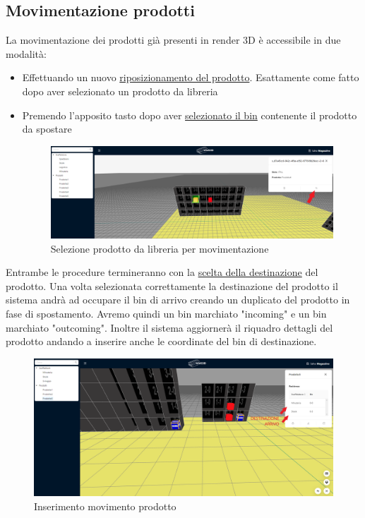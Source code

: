     \subsection{Movimentazione prodotti}\label{sec:movimento}
        La movimentazione dei prodotti già presenti in render 3D è accessibile in due modalità: 
        \begin{itemize}
            \item Effettuando un nuovo \hyperref[riposizionamento]{riposizionamento del prodotto}. Esattamente come fatto dopo aver selezionato un prodotto da libreria
            \item Premendo l'apposito tasto dopo aver \hyperref[sel_bin]{selezionato il bin} contenente il prodotto da spostare\\
            \begin{figure}[h!]
                \centering
                \includegraphics[width=1.0\textwidth]{images/movimentazione.png}
                \caption{Selezione prodotto da libreria per movimentazione}
            \end{figure}
        \end{itemize}
        Entrambe le procedure termineranno con la \hyperref[destinazione_prodotto]{scelta della destinazione} del prodotto. 
        Una volta selezionata correttamente la destinazione del prodotto il sistema andrà ad occupare il bin di arrivo creando un duplicato del prodotto in fase di 
        spostamento. Avremo quindi un bin marchiato "incoming" e un bin marchiato "outcoming". Inoltre il sistema aggiornerà il riquadro dettagli del prodotto andando a 
        inserire anche le coordinate del bin di destinazione.\\
        \begin{figure}[h!]
            \centering
            \includegraphics[width=1.0\textwidth]{images/movimento_prodotto.png}
            \caption{Inserimento movimento prodotto}
        \end{figure}\\

